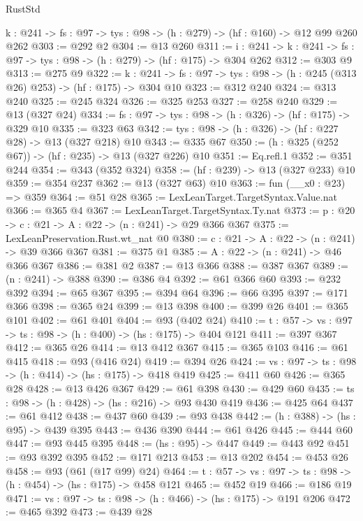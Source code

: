 \begin{lexlean}{RustStd}
\begin{coremodule}
  {k : @241} -> {fs : @97} -> {tys : @98} -> (h : @279) -> (hf : @160) -> @12 @99 @260 @262
@303 := @292 @2
@304 := @13 @260
@311 := {i : @241} ->
  {k : @241} -> {fs : @97} -> {tys : @98} -> (h : @279) -> (hf : @175) -> @304 @262
@312 := @303 @9
@313 := @275 @9
@322 := {k : @241} ->
  {fs : @97} -> {tys : @98} -> (h : @245 (@313 @26) @253) -> (hf : @175) -> @304 @10
@323 := @312 @240
@324 := @313 @240
@325 := @245 @324
@326 := @325 @253
@327 := @258 @240
@329 := @13 (@327 @24)
@334 := {fs : @97} -> {tys : @98} -> (h : @326) -> (hf : @175) -> @329 @10
@335 := @323 @63
@342 := {tys : @98} -> (h : @326) -> (hf : @227 @28) -> @13 (@327 @218) @10
@343 := @335 @67
@350 := (h : @325 (@252 @67)) -> (hf : @235) -> @13 (@327 @226) @10
@351 := Eq.refl.{1}
@352 := @351 @244
@354 := @343 (@352 @324)
@358 := (hf : @239) -> @13 (@327 @233) @10
@359 := @354 @237
@362 := @13 (@327 @63) @10
@363 := fun (__x0 : @23) => @359
@364 := @51 @28
@365 := LexLeanTarget.TargetSyntax.Value.nat
@366 := @365 @4
@367 := LexLeanTarget.TargetSyntax.Ty.nat
@373 := {p : @20} -> {c : @21} -> {A : @22} -> (n : @241) -> @29 @366 @367
@375 := LexLeanPreservation.Rust.wt_nat @0
@380 := {c : @21} -> {A : @22} -> (n : @241) -> @39 @366 @367
@381 := @375 @1
@385 := {A : @22} -> (n : @241) -> @46 @366 @367
@386 := @381 @2
@387 := @13 @366
@388 := @387 @367
@389 := (n : @241) -> @388
@390 := @386 @4
@392 := @61 @366 @60
@393 := @232 @392
@394 := @65 @367
@395 := @394 @64
@396 := @66 @395
@397 := @171 @366
@398 := @365 @24
@399 := @13 @398
@400 := @399 @26
@401 := @365 @101
@402 := @61 @401
@404 := @93 (@402 @24)
@410 := {t : @57} -> {vs : @97} -> {ts : @98} -> (h : @400) -> (hs : @175) -> @404 @121
@411 := @397 @367
@412 := @365 @26
@414 := @13 @412 @367
@415 := @365 @103
@416 := @61 @415
@418 := @93 (@416 @24)
@419 := @394 @26
@424 := {vs : @97} -> {ts : @98} -> (h : @414) -> (hs : @175) -> @418 @419
@425 := @411 @60
@426 := @365 @28
@428 := @13 @426 @367
@429 := @61 @398
@430 := @429 @60
@435 := {ts : @98} -> (h : @428) -> (hs : @216) -> @93 @430 @419
@436 := @425 @64
@437 := @61 @412
@438 := @437 @60
@439 := @93 @438
@442 := (h : @388) -> (hs : @95) -> @439 @395
@443 := @436 @390
@444 := @61 @426
@445 := @444 @60
@447 := @93 @445 @395
@448 := (hs : @95) -> @447
@449 := @443 @92
@451 := @93 @392 @395
@452 := @171 @213
@453 := @13 @202
@454 := @453 @26
@458 := @93 (@61 (@17 @99) @24)
@464 := {t : @57} -> {vs : @97} -> {ts : @98} -> (h : @454) -> (hs : @175) -> @458 @121
@465 := @452 @19
@466 := @186 @19
@471 := {vs : @97} -> {ts : @98} -> (h : @466) -> (hs : @175) -> @191 @206
@472 := @465 @392
@473 := @439 @28

\end{coremodule}
\end{lexlean}
